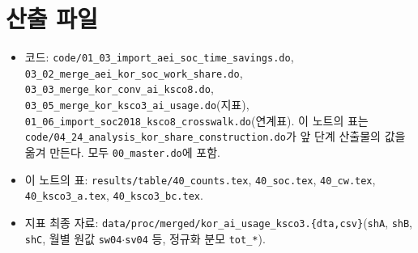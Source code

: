 \documentclass[11pt]{article}
\begin{document}
\section{산출 파일}

\begin{itemize}[leftmargin=*]
  \item 코드: \texttt{code/01\_03\_import\_aei\_soc\_time\_savings.do}, \texttt{03\_02\_merge\_aei\_kor\_soc\_work\_share.do}, \texttt{03\_03\_merge\_kor\_conv\_ai\_ksco8.do}, \texttt{03\_05\_merge\_kor\_ksco3\_ai\_usage.do}(지표), \texttt{01\_06\_import\_soc2018\_ksco8\_crosswalk.do}(연계표). 이 노트의 표는 \texttt{code/04\_24\_analysis\_kor\_share\_construction.do}가 앞 단계 산출물의 값을 옮겨 만든다. 모두 \texttt{00\_master.do}에 포함.
  \item 이 노트의 표: \texttt{results/table/40\_counts.tex}, \texttt{40\_soc.tex}, \texttt{40\_cw.tex}, \texttt{40\_ksco3\_a.tex}, \texttt{40\_ksco3\_bc.tex}.
  \item 지표 최종 자료: \texttt{data/proc/merged/kor\_ai\_usage\_ksco3.\{dta,csv\}}(\texttt{shA}, \texttt{shB}, \texttt{shC}, 월별 원값 \texttt{sw04}$\cdot$\texttt{sv04} 등, 정규화 분모 \texttt{tot\_*}).
\end{itemize}

\printbibliography[title={참고문헌}]
\end{document}
